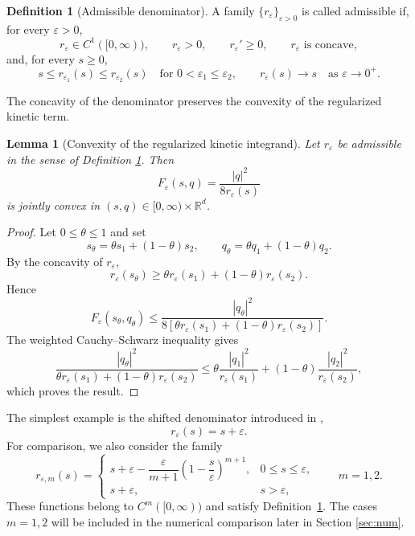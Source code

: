 \documentclass[11pt]{article}
\newcommand{\R}{\mathbb{R}}
\newcommand{\eps}{\varepsilon}
\theoremstyle{plain}
\newtheorem{lemma}[theorem]{Lemma}
\theoremstyle{definition}
\newtheorem{definition}[theorem]{Definition}
\numberwithin{equation}{section}
\begin{document}
\begin{definition}[Admissible denominator]
\label{def:admissible-regularization}
A family $\{r_\eps\}_{\eps>0}$ is called admissible if, for every
$\eps>0$,
\begin{equation}
\label{eq:regularization-admissibility-local}
r_\eps\in C^1([0,\infty)),
\qquad
r_\eps>0,
\qquad
r_\eps'\ge0,
\qquad
r_\eps \text{ is concave},
\end{equation}
and, for every $s\ge0$,
\begin{equation}
\label{eq:regularization-admissibility-limit}
s
\le
r_{\eps_1}(s)
\le
r_{\eps_2}(s)
\quad
\text{for }0<\eps_1\le\eps_2,
\qquad
r_\eps(s)\to s
\quad\text{as }\eps\to0^+.
\end{equation}
\end{definition}

The concavity of the denominator preserves the
convexity of the regularized kinetic term.

\begin{lemma}[Convexity of the regularized kinetic integrand]
\label{lem:regularized-kinetic-convexity}
Let $r_\eps$ be admissible in the sense of Definition \ref{def:admissible-regularization}. Then
\[
F_\eps(s,q)
=
\frac{|q|^2}{8r_\eps(s)}
\]
is jointly convex in $(s,q)\in[0,\infty)\times\R^d$.
\end{lemma}

\begin{proof}
Let $0\le\theta\le1$ and set
\[
s_\theta=\theta s_1+(1-\theta)s_2,
\qquad
q_\theta=\theta q_1+(1-\theta)q_2.
\]
By the concavity of $r_\eps$,
\[
r_\eps(s_\theta)
\ge
\theta r_\eps(s_1)+(1-\theta)r_\eps(s_2).
\]
Hence
\[
F_\eps(s_\theta,q_\theta)
\le
\frac{|q_\theta|^2}
{8[\theta r_\eps(s_1)+(1-\theta)r_\eps(s_2)]}.
\]
The weighted Cauchy--Schwarz inequality gives
\[
\frac{|q_\theta|^2}
{\theta r_\eps(s_1)+(1-\theta)r_\eps(s_2)}
\le
\theta\frac{|q_1|^2}{r_\eps(s_1)}
+
(1-\theta)\frac{|q_2|^2}{r_\eps(s_2)},
\]
which proves the result.
\end{proof} 

The simplest example is the shifted denominator introduced in
\cite{BaoRuan2019},
\begin{equation}
\label{eq:shift-denominator}
r_\eps(s)=s+\eps.
\end{equation}
For comparison, we also consider the family
\begin{equation}
\label{eq:piecewise-regularization-family}
r_{\eps,m}(s)
=
\begin{cases}
s+\eps-\dfrac{\eps}{m+1}
\left(1-\dfrac{s}{\eps}\right)^{m+1},
&0\le s\le\eps,\\[2ex]
s+\eps,
&s>\eps,
\end{cases}
\qquad m=1,2.
\end{equation}
These functions belong to $C^m([0,\infty))$ and satisfy
Definition~\ref{def:admissible-regularization}. The cases $m=1,2$
will be included in the numerical comparison later in Section \ref{sec:num}.
\end{document}
